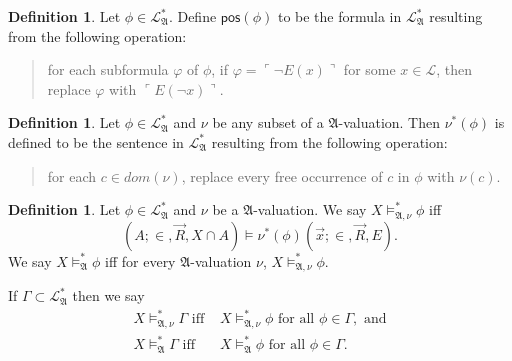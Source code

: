 \documentclass[12pt, twoside]{memoir}
\numberwithin{equation}{section}
\theoremstyle{definition}
\newtheorem{defi}[thm]{Definition}
\theoremstyle{remark}
\theoremstyle{definition}
\theoremstyle{definition}
\theoremstyle{definition}
\theoremstyle{remark}
\begin{document}
\begin{defi}
Let $\phi\in \mathcal{L}^{*}_{\mathfrak{A}}$. Define $\mathsf{pos}(\phi)$ to be the formula in $\mathcal{L}^{*}_{\mathfrak{A}}$ resulting from the following operation: 
\begin{quote}
    for each subformula $\varphi$ of $\phi$, if $\varphi = \ulcorner \neg E(x) \urcorner$ for some $x \in \mathcal{L}$, then replace $\varphi$ with $\ulcorner E(\neg x) \urcorner$.
\end{quote}
\end{defi}

\begin{defi}
Let $\phi\in \mathcal{L}^{*}_{\mathfrak{A}}$ and $\nu$ be any subset of a $\mathfrak{A}$-valuation. Then $\nu^*(\phi)$ is defined to be the sentence in $\mathcal{L}^{*}_{\mathfrak{A}}$ resulting from the following operation:
\begin{quote}
for each $c \in dom(\nu)$, replace every free occurrence of $c$ in $\phi$ with $\nu(c)$.
\end{quote}
\end{defi}

\begin{defi}\label{models}
Let $\phi \in \mathcal{L}^{*}_{\mathfrak{A}}$ and $\nu$ be a $\mathfrak{A}$-valuation. We say $X \models^*_{\mathfrak{A}, \nu} \phi$ iff $$(A; \in, \Vec{R}, X \cap A) \models \nu^*(\phi)(\Vec{x}; \in, \Vec{R}, E).$$ 
We say $X \models^*_{\mathfrak{A}} \phi$ iff for every $\mathfrak{A}$-valuation $\nu$, $X \models^*_{\mathfrak{A}, \nu} \phi$.

If $\Gamma \subset \mathcal{L}^*_{\mathfrak{A}}$ then we say
\begin{align*}
    X \models^*_{\mathfrak{A}, \nu} \Gamma \text{ iff } & X \models^*_{\mathfrak{A}, \nu} \phi \text{ for all } \phi \in \Gamma, \text{ and} \\ 
    X \models^*_{\mathfrak{A}} \Gamma \text{ iff } & X \models^*_{\mathfrak{A}} \phi \text{ for all } \phi \in \Gamma.
\end{align*}
\end{defi}
\end{document}
